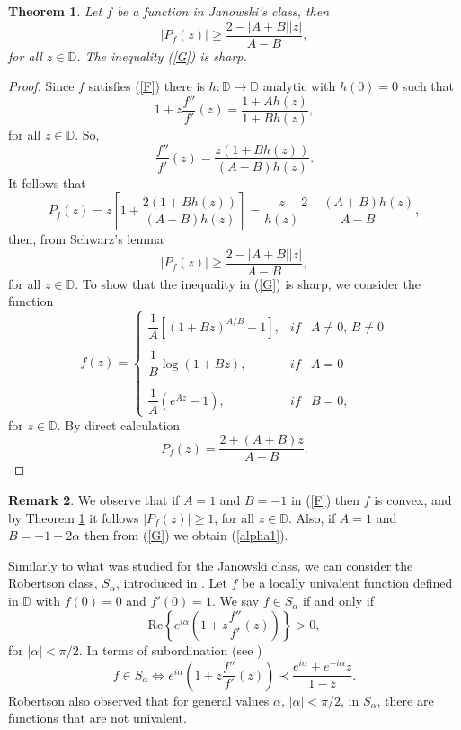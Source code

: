 \documentclass[reqno]{amsart}
\theoremstyle{plain}
\newtheorem{theo}{Theorem}[section]
\theoremstyle{definition}
\newtheorem{rem}[theo]{Remark}
\newcommand{\D}{\mathbb{D}}
\begin{document}
\begin{theo} \label{Jano}
Let $f$ be a function in Janowski's class, then
\begin{equation} \label{G}
|P_f(z)|\geq \frac{2-|A+B||z|}{A-B},    
\end{equation}
for all $z\in \D$. The inequality (\ref{G}) is sharp.   
\end{theo}
\begin{proof}
 Since $f$ satisfies (\ref{F}) there is $h:\D \to \D$ analytic with $h(0)=0$ such that
 \[
 1+z\frac{f''}{f'}(z)=\frac{1+Ah(z)}{1+Bh(z)},
 \]
 for all $z\in \D$. So, 
\[\frac{f''}{f'}(z)=\frac{z(1+Bh(z))}{(A-B)h(z)}.
\]
It follows that
\[
P_f(z)=z\left[1+\frac{2(1+Bh(z))}{(A-B)h(z)}\right]=\frac{z}{h(z)}\frac{2+(A+B)h(z)}{A-B},
\]
then, from Schwarz's lemma
\[|P_f(z)|\geq \frac{2-|A+B||z|}{A-B},\]
for all $z\in \D$. To show that the inequality in (\ref{G}) is sharp, we consider the function 
$$f(z)= \left\{ \begin{array}{lcc} \dfrac{1}{A} \left[(1+Bz)^{A/B}-1\right], & if & A\neq 0, \, B\neq 0 \\ \\ \dfrac{1}{B}\log(1+Bz), & if & A=0 \\ \\ \dfrac{1}{A}(e^{Az}-1), & if & B=0, \end{array} \right.$$
for $z\in \D$. By direct calculation   
\[P_f(z)=\frac{2+(A+B)z}{A-B}.\]
\end{proof}

\begin{rem}
   We observe that if $A=1$ and $B=-1$ in (\ref{F}) then $f$ is convex, and by Theorem \ref{Jano} it follows $|P_f(z)|\geq 1$, for all $z\in \D$. Also, if $A=1$ and $B=-1+2\alpha$ then from (\ref{G}) we obtain (\ref{alpha1}).
\end{rem}

Similarly to what was studied for the Janowski class, we can consider the Robertson class, $S_{\alpha}$, introduced in \cite{Robert1969}. Let $f$ be a locally univalent function defined in $\D$ with $f(0)=0$ and $f'(0)=1$. We say $f\in S_{\alpha}$ if and only if
\[\text{Re}\left\{e^{i\alpha}\left(1+z\frac{f''}{f'}(z)\right)\right\}>0,
\]
for $|\alpha|<\pi/2$. In terms of subordination (see \cite{Firoz2023})
\begin{equation} \label{Rob}
 f\in S_{\alpha} \Longleftrightarrow  e^{i\alpha}\left(1+z\frac{f''}{f'}(z)\right) \prec \frac{ e^{i\alpha}+ e^{-i\alpha}z}{1-z}.
\end{equation}
Robertson also observed that for general values $\alpha$, $|\alpha|<\pi/2$, in $S_{\alpha}$, there are functions that are not univalent.
\end{document}
